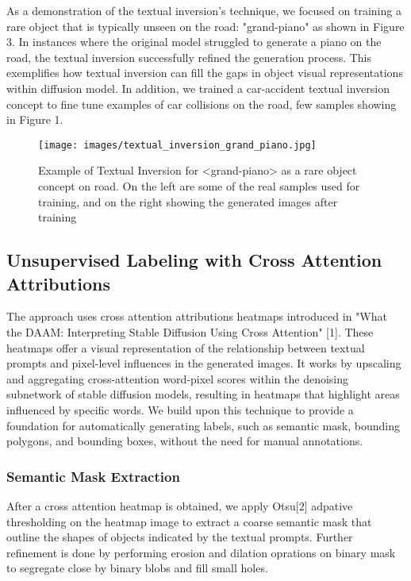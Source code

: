\documentclass{article}
\begin{document}
As a demonstration of the textual inversion's technique, we focused on training a rare object that is typically unseen on the road: "grand-piano" as shown in Figure 3. In instances where the original model struggled to generate a piano on the road, the textual inversion successfully refined the generation process. This exemplifies how textual inversion can fill the gaps in object visual representations within diffusion model. In addition, we trained a car-accident textual inversion concept to fine tune examples of car collisions on the road, few samples showing in Figure 1. 

\begin{figure}[H]
    \centering
    \texttt{[image: images/textual\_inversion\_grand\_piano.jpg]}
    \caption{Example of Textual Inversion for <grand-piano> as a rare object concept on road. On the left are some of the real samples used for training, and on the right showing the generated images after training}
    \label{fig:textual_inversion_grand_piano}
\end{figure}

\subsection{Unsupervised Labeling with Cross Attention Attributions}

The approach uses cross attention attributions heatmaps introduced in "What the DAAM: Interpreting Stable Diffusion Using Cross Attention" [1]. These heatmaps offer a visual representation of the relationship between textual prompts and pixel-level influences in the generated images. It works by upscaling and aggregating cross-attention word-pixel scores within the denoising subnetwork of stable diffusion models, resulting in heatmaps that highlight areas influenced by specific words. We build upon this technique to provide a foundation for automatically generating labels, such as semantic mask, bounding polygons, and bounding boxes, without the need for manual annotations.

\subsubsection{Semantic Mask Extraction}
After a cross attention heatmap is obtained, we apply Otsu[2] adpative thresholding on the heatmap image to extract a coarse semantic mask that outline the shapes of objects indicated by the textual prompts. Further refinement is done by performing erosion and dilation oprations on binary mask to segregate close by binary blobs and fill small holes. 
\end{document}
